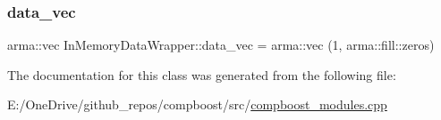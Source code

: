 \mbox{\label{class_in_memory_data_wrapper_a7dc9516de29c977acf3a403d511a49ea}} 
\subsubsection{\texorpdfstring{data\+\_\+vec}{data\_vec}}
{\footnotesize\ttfamily arma\+::vec In\+Memory\+Data\+Wrapper\+::data\+\_\+vec = arma\+::vec (1, arma\+::fill\+::zeros)\hspace{0.3cm}{\ttfamily [private]}}



The documentation for this class was generated from the following file\+:\begin{DoxyCompactItemize}
\item 
E\+:/\+One\+Drive/github\+\_\+repos/compboost/src/\mbox{\hyperlink{compboost__modules_8cpp}{compboost\+\_\+modules.\+cpp}}\end{DoxyCompactItemize}
